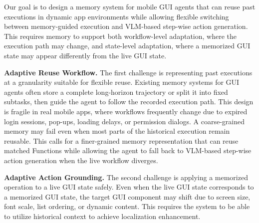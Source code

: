 Our goal is to design a memory system for mobile GUI agents that can reuse past executions in dynamic app environments while allowing flexible switching between memory-guided execution and VLM-based step-wise action generation.
This requires memory to support both workflow-level adaptation, where the execution path may change, and state-level adaptation, where a memorized GUI state may appear differently from the live GUI state.


\textbf{Adaptive Reuse Workflow.}
The first challenge is representing past executions at a granularity suitable for flexible reuse.
Existing memory systems for GUI agents often store a complete long-horizon trajectory or split it into fixed subtasks, then guide the agent to follow the recorded execution path.
This design is fragile in real mobile apps, where workflows frequently change due to expired login sessions, pop-ups, loading delays, or permission dialogs.
A coarse-grained memory may fail even when most parts of the historical execution remain reusable.
This calls for a finer-grained memory representation that can reuse matched Functions while allowing the agent to fall back to VLM-based step-wise action generation when the live workflow diverges.

\textbf{Adaptive Action Grounding.}
The second challenge is applying a memorized operation to a live GUI state safely.
Even when the live GUI state corresponds to a memorized GUI state, the target GUI component may shift due to screen size, font scale, list ordering, or dynamic content.
This requires the system to be able to utilize historical context to achieve localization enhancement.

\begin{table}[t]
  \centering
  \caption{Execution costs of different on-device inference backends.We use Qwen-vl-0.8B-W4A16 on OnePlus 12.}
  \label{tab:ondevice-cost}
\end{table}
